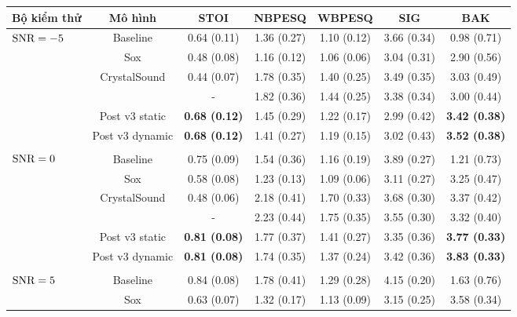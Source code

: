 		\begin{table}[h]
			\centering
			\begin{tabular}{l c c c c c c}
				\hline
				\multicolumn{1}{c}{\textbf{Bộ kiểm thử}}	& \textbf{Mô hình}	& \textbf{STOI}	& \textbf{NBPESQ}	& \textbf{WBPESQ}	& \textbf{SIG}	& \textbf{BAK} \\
				\hline
				\multirow{6}{*}{$\text{SNR}=-5$}        &Baseline       & 0.64 (0.11)   & 1.36 (0.27)   & 1.10 (0.12)   & 3.66 (0.34)  & 0.98 (0.71) \\
				&Sox    & 0.48 (0.08)   & 1.16 (0.12)   & 1.06 (0.06)   & 3.04 (0.31)   & 2.90 (0.56) \\
				&\multirow{2}{*}{CrystalSound}   & 0.44 (0.07)   & 1.78 (0.35)   & 1.40 (0.25)   & 3.49 (0.35)   & 3.03 (0.49) \\
				&       &  -  & 1.82 (0.36)   & 1.44 (0.25)   & 3.38 (0.34)   & 3.00 (0.44) \\
				&Post v3 static & \textbf{0.68 (0.12)}   & 1.45 (0.29)   & 1.22 (0.17)   & 2.99 (0.42)   & \textbf{3.42 (0.38)} \\
				&Post v3 dynamic        & \textbf{0.68 (0.12)}   & 1.41 (0.27)   & 1.19 (0.15)   & 3.02 (0.43)   & \textbf{3.52 (0.38)} \\
				&&&&&&\\
				\multirow{6}{*}{$\text{SNR}=0$}         &Baseline       & 0.75 (0.09)   & 1.54 (0.36)   & 1.16 (0.19)   & 3.89 (0.27)  & 1.21 (0.73) \\
				&Sox    & 0.58 (0.08)   & 1.23 (0.13)   & 1.09 (0.06)   & 3.11 (0.27)   & 3.25 (0.47) \\
				&\multirow{2}{*}{CrystalSound}   & 0.48 (0.06)   & 2.18 (0.41)   & 1.70 (0.33)   & 3.68 (0.30)   & 3.37 (0.42) \\
				&       &  -  & 2.23 (0.44)   & 1.75 (0.35)   & 3.55 (0.30)   & 3.32 (0.40) \\
				&Post v3 static & \textbf{0.81 (0.08)}   & 1.77 (0.37)   & 1.41 (0.27)   & 3.35 (0.36)   & \textbf{3.77 (0.33)} \\
				&Post v3 dynamic        & \textbf{0.81 (0.08)}   & 1.74 (0.35)   & 1.37 (0.24)   & 3.42 (0.36)   & \textbf{3.83 (0.33)} \\
				&&&&&&\\
				\multirow{6}{*}{$\text{SNR}=5$}         &Baseline       & 0.84 (0.08)   & 1.78 (0.41)   & 1.29 (0.28)   & 4.15 (0.20)  & 1.63 (0.76) \\
				&Sox    & 0.63 (0.07)   & 1.32 (0.17)   & 1.13 (0.09)   & 3.15 (0.25)   & 3.58 (0.34) \\

\end{tabular}
\end{table}
